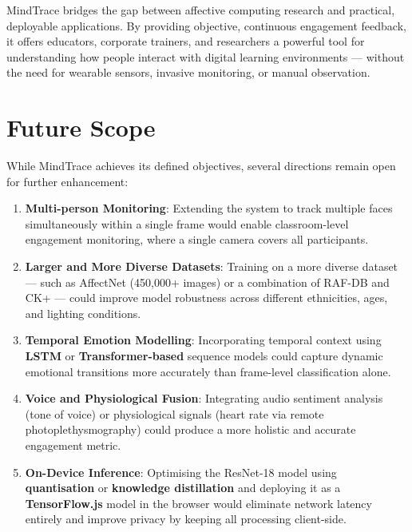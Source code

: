 MindTrace bridges the gap between affective computing research and practical,
deployable applications. By providing objective, continuous engagement feedback,
it offers educators, corporate trainers, and researchers a powerful tool for
understanding how people interact with digital learning environments — without
the need for wearable sensors, invasive monitoring, or manual observation.

\section{Future Scope}

While MindTrace achieves its defined objectives, several directions remain
open for further enhancement:

\begin{enumerate}
    \item \textbf{Multi-person Monitoring}: Extending the system to track
          multiple faces simultaneously within a single frame would enable
          classroom-level engagement monitoring, where a single camera
          covers all participants.

    \item \textbf{Larger and More Diverse Datasets}: Training on a more
          diverse dataset — such as AffectNet (450,000+ images) or a
          combination of RAF-DB and CK+ — could improve model robustness
          across different ethnicities, ages, and lighting conditions.

    \item \textbf{Temporal Emotion Modelling}: Incorporating temporal
          context using \textbf{LSTM} or \textbf{Transformer-based}
          sequence models could capture dynamic emotional transitions
          more accurately than frame-level classification alone.

    \item \textbf{Voice and Physiological Fusion}: Integrating audio
          sentiment analysis (tone of voice) or physiological signals
          (heart rate via remote photoplethysmography) could produce a
          more holistic and accurate engagement metric.

    \item \textbf{On-Device Inference}: Optimising the ResNet-18 model
          using \textbf{quantisation} or \textbf{knowledge distillation}
          and deploying it as a \textbf{TensorFlow.js} model in the browser
          would eliminate network latency entirely and improve privacy by
          keeping all processing client-side.


\end{enumerate}
